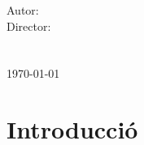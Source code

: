 \documentclass[12pt,twoside,a4paper]{report/tesis}
\newcommand{\clearemptydoublepage}{\newpage{\pagestyle{empty}\cleardoublepage}}
\begin{document}
\vspace{2cm}

\begin{center}
\thispagestyle{empty}



\

\

\

\


\


{\Large {\sc \universitat}}\\
\vspace{3mm}
{\normalsize {\escola}} \\
\

\


{\Large {\sc \titledockind}}\\


\

\


{\Large {\bf \titledoc}}\\ 
\vspace{2mm}
{\Large {\bf \ }} \\
\vspace{1mm}
{\Large {\bf }}

\

\

\

\end{center}

\begin{flushright}
{\normalsize Autor: \bf \authordoc\hspace{1cm}}\\
\vspace{1mm}
{\normalsize {Director: \bf \directordoc}}\\
\vspace{1mm}
{\normalsize {\escola}}\\
\vspace{1mm}
{\normalsize {\titulacio}}\\
\vspace{1cm}
{\normalsize {\today}}\\
\end{flushright}

\break
\clearemptydoublepage

\chapter*{Introducció}
\thispagestyle{empty}

\clearemptydoublepage
\end{document}
